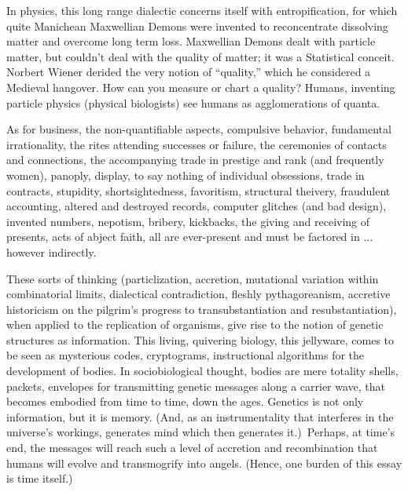 \documentclass[11pt,twoside,draft]{memoir}
\begin{document}
In physics, this long range dialectic concerns itself with entropification, for which
quite Manichean Maxwellian Demons were
invented to reconcentrate dissolving matter and overcome long term loss. Maxwellian Demons
dealt with particle matter, but couldn't deal with the quality of matter; it
was a Statistical conceit. Norbert Wiener
derided the very notion of \enquote{quality,} which
he considered a Medieval hangover. How
can you measure or chart a quality? Humans,
inventing particle physics (physical biologists) see humans as agglomerations of
quanta.

As for business, the non-quantifiable aspects, compulsive behavior, fundamental irrationality, the rites attending successes or
failure, the ceremonies of contacts and connections, the accompanying trade in prestige and rank (and frequently women), panoply, display, to say nothing of individual obsessions, trade in contracts, stupidity, shortsightedness, favoritism, structural theivery,
fraudulent accounting, altered and destroyed
records, computer glitches (and bad design),
invented numbers, nepotism, bribery, kickbacks, the giving and receiving of presents,
acts of abject faith, all are ever-present and
must be factored in ... however indirectly.

These sorts of thinking (particlization, accretion,
mutational variation within combinatorial limits, dialectical contradiction,
fleshly pythagoreanism, accretive historicism
on the pilgrim's progress to transubstantiation and resubstantiation), when applied to
the replication of organisms, give rise to the
notion of genetic structures as information.
This living, quivering biology, this jellyware,
comes to be seen as mysterious codes, cryptograms, instructional algorithms for the development of bodies. In sociobiological
thought, bodies are mere totality shells, packets, envelopes for transmitting genetic
messages along a carrier wave, that becomes embodied from time to time, down the ages.
Genetics is not only information, but it is memory.
(And, as an instrumentality that
interferes in the universe's workings, generates mind which then generates it.)\
Perhaps, at time's end, the messages will reach
such a level of accretion and recombination
that humans will evolve and transmogrify
into angels. (Hence, one burden of this essay is time itself.)

\chapter{}
\end{document}

